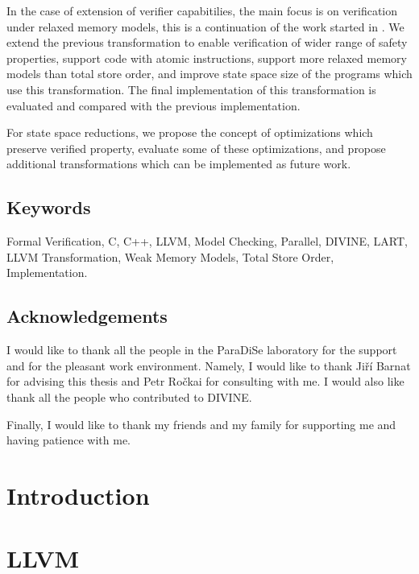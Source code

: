 \documentclass[11pt,twoside,a4paper]{book}
\newcommand{\divine}{\mbox{\textsf{DIVINE}}\xspace}
\newcommand{\lart}{\mbox{\textsf{LART}}\xspace}
\newcommand{\paradise}{ParaDiSe\xspace}
\newcommand{\llvm}{\textsf{LLVM}\xspace}
\begin{document}
In the case of extension of verifier capabitilies, the main focus is on
verification under relaxed memory models, this is a continuation of the work
started in \cite{SRB15}. We extend the previous transformation to enable
verification of wider range of safety properties, support code with atomic
instructions, support more relaxed memory models than total store order, and
improve state space size of the programs which use this transformation. The
final implementation of this transformation is evaluated and compared with the
previous implementation.

For state space reductions, we propose the concept of optimizations which
preserve verified property, evaluate some of these optimizations, and propose
additional transformations which can be implemented as future work.

\section*{Keywords}
Formal Verification, C, C++, \llvm, Model Checking, Parallel,
\divine, \lart, \llvm Transformation, Weak Memory Models, Total Store Order,
Implementation.

\cleardoublepage

\section*{Acknowledgements} I would like to thank all the people in the
\paradise laboratory for the support and for the pleasant work environment.
Namely, I would like to thank Jiří Barnat for advising this thesis and Petr
Ročkai for consulting with me. I would also like thank all the people who
contributed to \divine.

Finally, I would like to thank my friends and my family for supporting me and
having patience with me.

\cleardoublepage
\thispagestyle{empty}

\pagestyle{headings}
\tableofcontents %
\mainmatter

\chapter{Introduction}\label{chap:introduction}


\chapter{\llvm} \label{chap:llvm}

\end{document}
